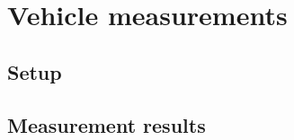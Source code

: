 \section{Vehicle measurements}
\label{sec:vehicle}

\subsection{Setup}
\label{sec:vehicle-setup}

\subsection{Measurement results}
\label{sec:vehicle-meas}

